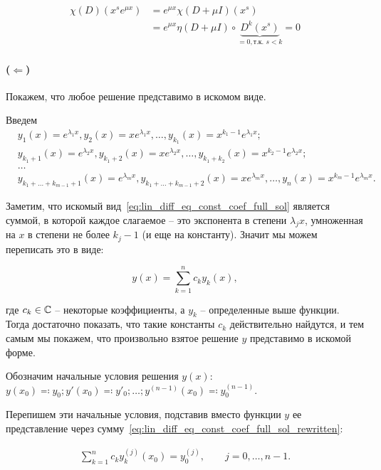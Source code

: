 \begin{align*}
    \chi(D)(x^s e^{\mu x}) &= e^{\mu x} \chi(D + \mu I)(x^s) \\
    &= e^{\mu x} \eta (D + \mu I) \circ
    \underbrace{D^k (x^s)}_{= 0, \text{т.к. } s<k} = 0
\end{align*}

\paragraph{($\Leftarrow$)} Покажем, что любое решение представимо в искомом виде.

Введем
\begin{align*}
    &y_1(x) = e^{\lambda_1 x}, y_2(x) = xe^{\lambda_1 x}, \dots, y_{k_1}(x) = x^{k_1-1}e^{\lambda_1 x}; \\
    &y_{k_1+1}(x) = e^{\lambda_2 x}, y_{k_1+2}(x) = xe^{\lambda_2 x}, \dots, y_{k_1 + k_2}(x) = x^{k_2 - 1}e^{\lambda_2 x}; \\
    &\dots\\
    &y_{k_1+\dots+k_{m-1}+1}(x)=e^{\lambda_m x}, y_{k_1+\dots+k_{m-1}+2}(x)=xe^{\lambda_m x}, \dots, y_n(x)=x^{k_m-1}e^{\lambda_m x}.
\end{align*}

Заметим, что искомый вид~\ref{eq:lin_diff_eq_const_coef_full_sol} является суммой, в которой каждое слагаемое -- это экспонента в степени $\lambda_j x$, умноженная на $x$ в степени не более $k_j - 1$ (и еще на константу).
Значит мы можем переписать это в виде:

\begin{equation}
    y(x) = \sum_{k=1}^n c_k y_k(x),
    \label{eq:lin_diff_eq_const_coef_full_sol_rewritten}
\end{equation}

где $c_k \in \mathbb{C}$ -- некоторые коэффициенты, а $y_k$ -- определенные выше функции. Тогда достаточно показать, что такие константы $c_k$ действительно найдутся, и тем самым мы покажем, что произвольно взятое решение $y$ представимо в искомой форме.

Обозначим начальные условия решения $y(x)$: $y(x_0) \eqqcolon y_0; y'(x_0) \eqqcolon y'_0; \dots; y^{(n-1)}(x_0) \eqqcolon y^{(n-1)}_0$.

Перепишем эти начальные условия, подставив вместо функции $y$ ее представление через сумму~\ref{eq:lin_diff_eq_const_coef_full_sol_rewritten}:

\begin{align*}
    \sum_{k=1}^n c_k y_k^{(j)}(x_0) = y^{(j)}_0, \qquad j = 0, \dots, n-1.
\end{align*}

